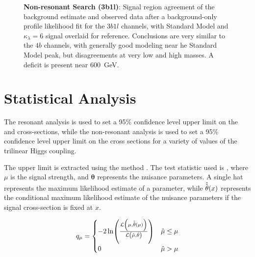 \begin{figure}[ht]
  \centering
   \hspace*{-2cm}
  \caption{\label{fig:nonres-sr-mhh-3b1l} \textbf{Non-resonant Search (3b1l)}: Signal region agreement of the background estimate and observed data after a background-only profile likelihood fit for the $3b1l$ channels, with Standard Model
  and $\kappa_{\lambda}=6$ signal overlaid for reference. Conclusions are very similar to the $4b$ channels, with generally good modeling near he Standard Model peak, but disagreements at very low and high masses. A deficit is present near \SI{600}{\GeV}.}
\end{figure}

\FloatBarrier
\clearpage
\section{Statistical Analysis}
The resonant analysis is used to set a 95\% confidence level upper limit on the
\HepProcess{\Pp \Pp \to \PScal \to \higgs \higgs \to \Pqb \Paqb \Pqb \Paqb} and
\HepProcess{\Pp \Pp \to \PGrav \to \higgs \higgs \to \Pqb \Paqb \Pqb \Paqb} cross-sections, 
while the non-resonant analysis is used to set a 95\% confidence level upper limit on the
\HepProcess{\Pp \Pp \to \higgs \higgs \to \Pqb \Paqb \Pqb \Paqb} cross sections for a 
variety of values of the trilinear Higgs coupling.

The upper limit is extracted using the \CLs method \cite{Read02}. The test statistic 
used is \qmu \cite{Cowan11}, where $\mu$ is the signal strength, and $\mathbf{\theta}$ represents the nuisance
parameters. A single hat represents
the maximum likelihood estimate of a parameter, while
$\hat{\hat{\mathbf{\theta}}}\qty(x)$ represents the conditional maximum
likelihood estimate of the nuisance parameters if the signal cross-section is
fixed at $x$.


\begin{equation}
	\label{eqn:qmu-def}
	{q}_{\mu} =
	\begin{cases}
		-2\ln(\frac{\mathcal{L}\qty(\mu, \hat{\hat{\mathbf{\theta}}}\qty(\mu))}{\mathcal{L}\qty(\hat{\mu},
		\hat{\mathbf{\theta}})})              & \hat{\mu} \le \mu \\
		0                                     & \hat{\mu} > \mu
	\end{cases}
\end{equation}

